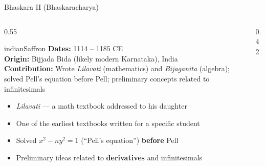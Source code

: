 \begin{frame}[shrink=21]{Bhaskara II (Bhaskaracharya)}

  \begin{columns}[T]
    \begin{column}{0.55\textwidth}
      \begin{personbox}{indianSaffron}
        \small
        \textbf{Dates:} 1114 -- 1185 CE\\
        \textbf{Origin:} Bijjada Bida (likely modern Karnataka), India\\
        \textbf{Contribution:} Wrote \emph{Lilavati} (mathematics) and
        \emph{Bijaganita} (algebra); solved Pell's equation before Pell;
        preliminary concepts related to infinitesimals
      \end{personbox}

      \vspace{0.3em}
      \begin{itemize}
        \item \emph{Lilavati} --- a math textbook \alert{addressed to his daughter}
        \item One of the earliest textbooks written for a specific student
        \item Solved $x^2 - ny^2 = 1$ (``Pell's equation'') \textbf{before} Pell
        \item Preliminary ideas related to \textbf{derivatives} and infinitesimals
      \end{itemize}
    \end{column}

    \begin{column}{0.42\textwidth}

      \vspace{0.3em}
    \end{column}
  \end{columns}

\end{frame}

